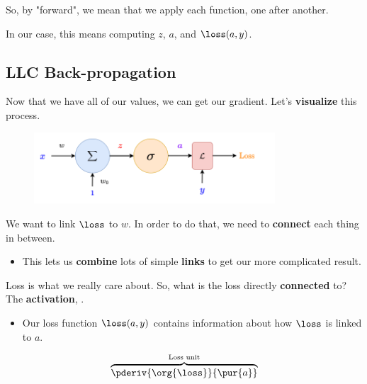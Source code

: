         So, by "forward", we mean that we apply each function, one after another.
        
        In our case, this means computing $z$, $a$, and $\loss(a,y)$.
        
    \phantom{}
    
    \subsection{LLC Back-propagation}
    
        Now that we have all of our values, we can get our gradient. Let's \textbf{visualize} this process.
        
        \begin{figure}[H]
            \centering
            \includegraphics[width=90mm,scale=0.4]{images/nn_2_images/llc_as_neuron_loss.png}
        \end{figure}
        
        We want to link $\loss$ to $w$. In order to do that, we need to \textbf{connect} each thing in between.

        \begin{itemize}
            \item This lets us \textbf{combine} lots of simple \textbf{links} to get our more complicated result.
        \end{itemize}

        \phantom{}
        
        Loss \org{$\loss$} is what we really care about. So, what is the loss directly \textbf{connected} to? The \textbf{activation}, .

        \begin{itemize}
            \item Our loss function $\loss(a,y)$ contains information about how $\loss$ is linked to $a$.
        \end{itemize}
        
        
        
        \begin{equation}
            \overbrace{
                \pderiv {\org{\loss}} {\pur{a}} 
            }^{\text{Loss unit}} 
        \end{equation}

